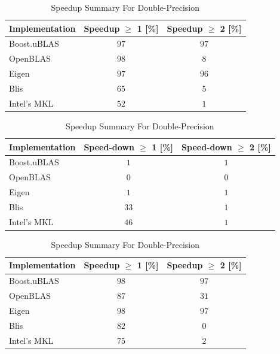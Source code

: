 \begin{table}[ht]
    \centering
    \caption{Speedup Summary For Single-Precision}
    \begin{tabular}{|l|c|c|}
        \hline
        \textbf{Implementation} & \textbf{Speedup $\geq$ 1 [\%]} & \textbf{Speedup $\geq$ 2 [\%]}\\
        \hline
        Boost.uBLAS & $97$ & $97$ \\
        \hline
        OpenBLAS    & $98$ & $8$ \\
        \hline
        Eigen       & $97$ & $96$ \\
        \hline
        Blis        & $65$ & $5$ \\
        \hline
        Intel's MKL & $52$ & $1$ \\
        \hline
    \end{tabular}
    
    \begin{tabular}{|l|c|c|}
        \hline
        \textbf{Implementation} & \textbf{Speed-down $\geq$ 1 [\%]} & \textbf{Speed-down $\geq$ 2 [\%]}\\
        \hline
        Boost.uBLAS & $1$ & $1$ \\
        \hline
        OpenBLAS    & $0$ & $0$ \\
        \hline
        Eigen       & $1$ & $1$ \\
        \hline
        Blis        & $33$ & $1$ \\
        \hline
        Intel's MKL & $46$ & $1$ \\
        \hline
    \end{tabular}
    
    \vspace*{1 cm}

    \centering
    \caption{Speedup Summary For Double-Precision}
    \begin{tabular}{|l|c|c|}
        \hline
        \textbf{Implementation} & \textbf{Speedup $\geq$ 1 [\%]} & \textbf{Speedup $\geq$ 2 [\%]}\\
        \hline
        Boost.uBLAS & $98$ & $97$ \\
        \hline
        OpenBLAS    & $87$ & $31$ \\
        \hline
        Eigen       & $98$ & $97$ \\
        \hline
        Blis        & $82$ & $0$ \\
        \hline
        Intel's MKL & $75$ & $2$ \\
        \hline
    \end{tabular}
    

\end{table}
